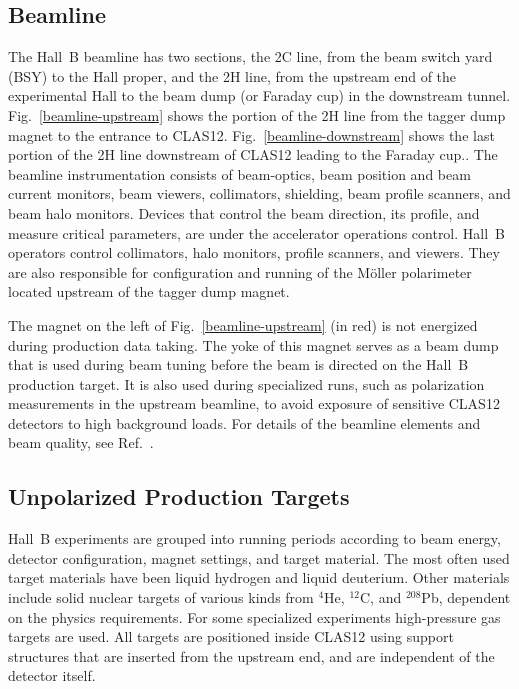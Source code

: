 \documentclass[final,3p,twocolumn]{elsarticle}
\begin{document}
\subsection{Beamline}

The Hall~B beamline has two sections, the 2C line, from the beam switch yard (BSY) to the Hall proper, and the 2H
line, from the upstream end of the experimental Hall to the beam dump (or Faraday cup) in the downstream tunnel.
Fig.~\ref{beamline-upstream} shows the portion of the 2H line from the tagger dump magnet to the entrance to
CLAS12. Fig.~\ref{beamline-downstream} shows the last portion of the 2H line downstream of CLAS12 leading to
the Faraday cup.. The beamline instrumentation consists of beam-optics, beam position and beam current monitors,
beam viewers, collimators,  shielding, beam profile scanners, and beam halo monitors. Devices that control the beam
direction, its profile, and  measure critical parameters, are under the accelerator operations control. Hall~B operators
control collimators, halo monitors, profile scanners, and viewers. They are also responsible for configuration and
running of the M\"oller polarimeter located upstream of the tagger dump magnet.

The magnet on the left of Fig.~\ref{beamline-upstream} (in red) is not energized during production data taking. The
yoke of this magnet serves as a beam dump that is used during beam tuning before the beam is directed on the Hall~B
production target. It is also used during specialized runs, such as polarization measurements in the upstream beamline,
to avoid exposure of sensitive CLAS12 detectors to high background loads. For details of the beamline elements and
beam quality, see Ref.~\cite{beamline}.  
 
\subsection{Unpolarized Production Targets} 

Hall~B experiments are grouped into running periods according to beam energy, detector configuration, magnet
settings, and target material. The most often used target materials have been liquid hydrogen and liquid deuterium.
Other materials include solid nuclear targets of various kinds from $^4$He, $^{12}$C, and $^{208}$Pb, dependent on
the physics requirements. For some specialized experiments high-pressure gas targets are used. All targets are 
positioned inside CLAS12 using support structures that are inserted from
the upstream end, and are independent of the detector itself. 
\end{document}
